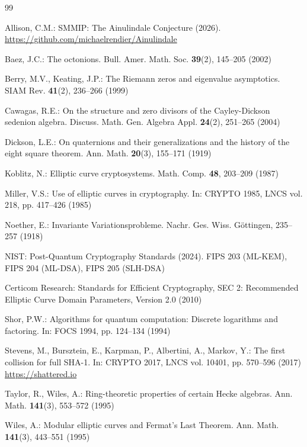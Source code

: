 \documentclass[runningheads]{llncs}
\theoremstyle{plain}
\theoremstyle{definition}
\begin{document}

\begin{thebibliography}{99}

Allison, C.M.: SMMIP: The Ainulindale Conjecture (2026).
\url{https://github.com/michaelrendier/Ainulindale}

Baez, J.C.: The octonions.
Bull. Amer. Math. Soc. \textbf{39}(2), 145--205 (2002)

Berry, M.V., Keating, J.P.: The Riemann zeros and eigenvalue asymptotics.
SIAM Rev. \textbf{41}(2), 236--266 (1999)

Cawagas, R.E.: On the structure and zero divisors of the Cayley-Dickson sedenion algebra.
Discuss. Math. Gen. Algebra Appl. \textbf{24}(2), 251--265 (2004)

Dickson, L.E.: On quaternions and their generalizations and the history of the
eight square theorem. Ann. Math. \textbf{20}(3), 155--171 (1919)

Koblitz, N.: Elliptic curve cryptosystems.
Math. Comp. \textbf{48}, 203--209 (1987)

Miller, V.S.: Use of elliptic curves in cryptography.
In: CRYPTO 1985, LNCS vol. 218, pp. 417--426 (1985)

Noether, E.: Invariante Variationsprobleme.
Nachr. Ges. Wiss. Göttingen, 235--257 (1918)

NIST: Post-Quantum Cryptography Standards (2024).
FIPS 203 (ML-KEM), FIPS 204 (ML-DSA), FIPS 205 (SLH-DSA)

Certicom Research: Standards for Efficient Cryptography, SEC 2:
Recommended Elliptic Curve Domain Parameters, Version 2.0 (2010)

Shor, P.W.: Algorithms for quantum computation: Discrete logarithms and factoring.
In: FOCS 1994, pp. 124--134 (1994)

Stevens, M., Bursztein, E., Karpman, P., Albertini, A., Markov, Y.:
The first collision for full SHA-1.
In: CRYPTO 2017, LNCS vol. 10401, pp. 570--596 (2017)
\url{https://shattered.io}

Taylor, R., Wiles, A.: Ring-theoretic properties of certain Hecke algebras.
Ann. Math. \textbf{141}(3), 553--572 (1995)

Wiles, A.: Modular elliptic curves and Fermat's Last Theorem.
Ann. Math. \textbf{141}(3), 443--551 (1995)

\end{thebibliography}
\end{document}
